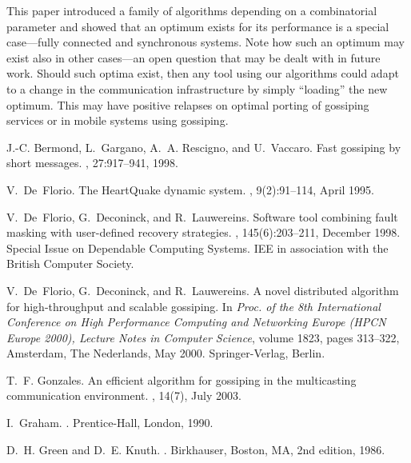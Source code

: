 \documentclass{elsart}
\begin{document}
This paper introduced a family of algorithms depending on a combinatorial parameter and
showed that an optimum exists for its performance is a special case---fully connected and
synchronous systems. Note how such an optimum may exist also in other cases---an open question
that may be dealt with in future work. Should such optima exist, then any tool using
our algorithms could adapt to a change in the communication infrastructure by simply
``loading'' the new optimum. This may have positive relapses on optimal porting of
gossiping services or in mobile systems using gossiping.



\begin{thebibliography}{10}\setlength{\itemsep}{-1ex}\small

J.-C. Bermond, L.~Gargano, A.~A. Rescigno, and U.~Vaccaro.
\newblock Fast gossiping by short messages.
, 27:917--941, 1998.

V.~De~Florio.
\newblock The {H}eart{Q}uake dynamic system.
, 9(2):91--114, April 1995.

V.~De~Florio, G.~Deconinck, and R.~Lauwereins.
\newblock Software tool combining fault masking with user-defined recovery
  strategies.
, 145(6):203--211, December 1998.
\newblock Special Issue on Dependable Computing Systems. IEE in association
  with the British Computer Society.

V.~De~Florio, G.~Deconinck, and R.~Lauwereins.
\newblock A novel distributed algorithm for high-throughput and scalable
  gossiping.
\newblock In {\em Proc. of the 8th International Conference on High Performance
  Computing and Networking Europe (HPCN Europe 2000), Lecture Notes in Computer
  Science}, volume 1823, pages 313--322, Amsterdam, The Nederlands, May 2000.
  Springer-Verlag, Berlin.

T.~F. Gonzales.
\newblock An efficient algorithm for gossiping in the multicasting
  communication environment.
, 14(7),
  July 2003.

I.~Graham.
.
\newblock Prentice-Hall, London, 1990.

D.~H. Green and D.~E. Knuth.
.
\newblock Birkhauser, Boston, MA, 2nd edition, 1986.


\end{thebibliography}
\end{document}
